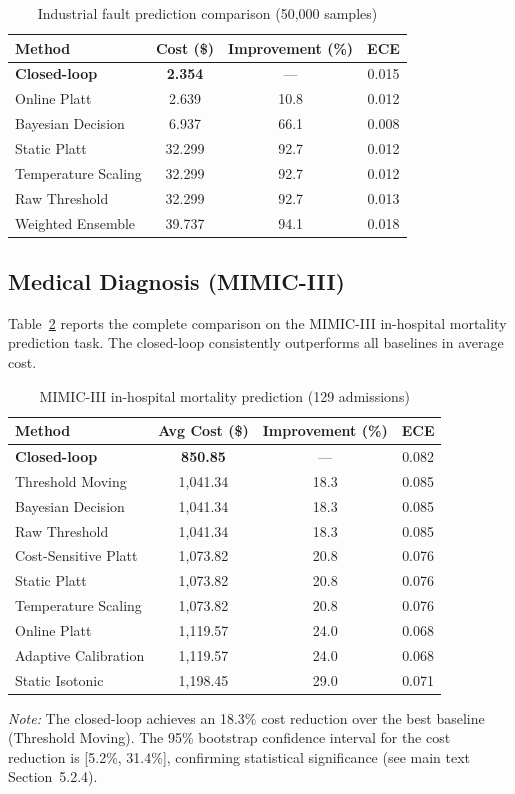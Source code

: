 \documentclass[12pt,a4paper]{article}
\begin{document}
\begin{table}[h]
\centering
\caption{Industrial fault prediction comparison (50,000 samples)}
\label{tab:industrial}
\begin{tabular}{lccc}
\toprule
Method & Cost (\$) & Improvement (\%) & ECE \\
\midrule
\textbf{Closed-loop} & \textbf{2.354} & --- & 0.015 \\
Online Platt & 2.639 & 10.8 & 0.012 \\
Bayesian Decision & 6.937 & 66.1 & 0.008 \\
Static Platt & 32.299 & 92.7 & 0.012 \\
Temperature Scaling & 32.299 & 92.7 & 0.012 \\
Raw Threshold & 32.299 & 92.7 & 0.013 \\
Weighted Ensemble & 39.737 & 94.1 & 0.018 \\
\bottomrule
\end{tabular}
\end{table}


\subsection{Medical Diagnosis (MIMIC-III)}

Table~\ref{tab:mimic} reports the complete comparison on the MIMIC-III in-hospital mortality prediction task. The closed-loop consistently outperforms all baselines in average cost.

\begin{table}[ht]
\centering
\caption{MIMIC-III in-hospital mortality prediction (129 admissions)}
\label{tab:mimic}
\begin{tabular}{lccc}
\toprule
Method & Avg Cost (\$) & Improvement (\%) & ECE \\
\midrule
\textbf{Closed-loop} & \textbf{850.85} & --- & 0.082 \\
Threshold Moving & 1,041.34 & 18.3 & 0.085 \\
Bayesian Decision & 1,041.34 & 18.3 & 0.085 \\
Raw Threshold & 1,041.34 & 18.3 & 0.085 \\
Cost-Sensitive Platt & 1,073.82 & 20.8 & 0.076 \\
Static Platt & 1,073.82 & 20.8 & 0.076 \\
Temperature Scaling & 1,073.82 & 20.8 & 0.076 \\
Online Platt & 1,119.57 & 24.0 & 0.068 \\
Adaptive Calibration & 1,119.57 & 24.0 & 0.068 \\
Static Isotonic & 1,198.45 & 29.0 & 0.071 \\
\bottomrule
\end{tabular}
\vspace{4mm}
\par\noindent\textit{Note:} The closed-loop achieves an 18.3\% cost reduction over the best baseline (Threshold Moving). The 95\% bootstrap confidence interval for the cost reduction is [5.2\%, 31.4\%], confirming statistical significance (see main text Section~5.2.4).
\end{table}
\end{document}

